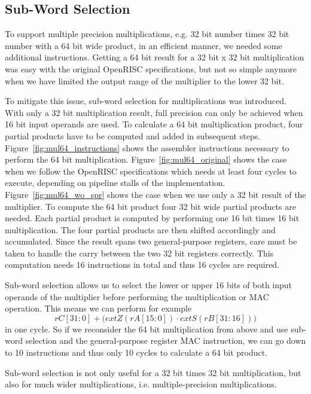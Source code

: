 \subsection{Sub-Word Selection}

To support multiple precision multiplications, e.g. 32 bit number times 32 bit
number with a 64 bit wide product, in an efficient manner, we needed some additional
instructions. Getting a 64 bit result for a 32 bit x 32 bit multiplication was
easy with the original OpenRISC specifications, but not so simple anymore when
we have limited the output range of the multiplier to the lower 32 bit.

To mitigate this issue, sub-word selection for multiplications was introduced.
With only a 32 bit multiplication result, full precision can only be achieved
when 16 bit input operands are used. To calculate a 64 bit multiplication
product, four partial products have to be computed and added in subsequent
steps. Figure~\ref{fig:mul64_instructions} shows the assembler instructions
necessary to perform the 64 bit multiplication.
Figure~\ref{fig:mul64_original} shows the case when we follow the OpenRISC
specifications which needs at least four cycles to execute, depending on
pipeline stalls of the implementation.
Figure~\ref{fig:mul64_wo_spr} shows the case when we use only a 32 bit result of
the multiplier. To compute the 64 bit product four 32 bit wide partial products
are needed. Each partial product is computed by performing one 16 bit times 16
bit multiplication. The four partial products are then shifted accordingly and
accumulated. Since the result spans two general-purpose registers, care must be
taken to handle the carry between the two 32 bit registers correctly. This
computation needs 16 instructions in total and thus 16 cycles are required.

Sub-word selection allows us to select the lower or upper 16 bits of both input
operands of the multiplier before performing the multiplication or \gls{MAC}
operation. This means we can perform for example
$$
rC[31:0] + \big(extZ\left(rA[15:0]\right) \cdot extS\left(rB[31:16]\right)\big)
$$
in one cycle.
So if we reconsider the 64 bit multiplication from above and use sub-word
selection and the general-purpose register \gls{MAC} instruction, we can go down
to 10 instructions and thus only 10 cycles to calculate a 64 bit product.

Sub-word selection is not only useful for a 32 bit times 32 bit multiplication,
but also for much wider multiplications, i.e. multiple-precision
multiplications.

